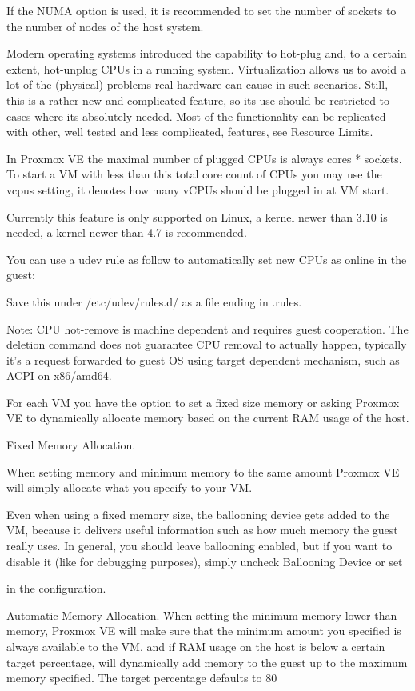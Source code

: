 If the NUMA option is used, it is recommended to set the number of sockets to the number of nodes of the host system.

Modern operating systems introduced the capability to hot-plug and, to a certain extent, hot-unplug CPUs in a running system. Virtualization allows us to avoid a lot of the (physical) problems real hardware can cause in such scenarios. Still, this is a rather new and complicated feature, so its use should be restricted to cases where its absolutely needed. Most of the functionality can be replicated with other, well tested and less complicated, features, see Resource Limits.

In Proxmox VE the maximal number of plugged CPUs is always cores * sockets. To start a VM with less than this total core count of CPUs you may use the vcpus setting, it denotes how many vCPUs should be plugged in at VM start.

Currently this feature is only supported on Linux, a kernel newer than 3.10 is needed, a kernel newer than 4.7 is recommended.

You can use a udev rule as follow to automatically set new CPUs as online in the guest:

Save this under /etc/udev/rules.d/ as a file ending in .rules.

Note: CPU hot-remove is machine dependent and requires guest cooperation. The deletion command does not guarantee CPU removal to actually happen, typically it’s a request forwarded to guest OS using target dependent mechanism, such as ACPI on x86/amd64.

For each VM you have the option to set a fixed size memory or asking Proxmox VE to dynamically allocate memory based on the current RAM usage of the host.

Fixed Memory Allocation.

When setting memory and minimum memory to the same amount Proxmox VE will simply allocate what you specify to your VM.

Even when using a fixed memory size, the ballooning device gets added to the VM, because it delivers useful information such as how much memory the guest really uses. In general, you should leave ballooning enabled, but if you want to disable it (like for debugging purposes), simply uncheck Ballooning Device or set

in the configuration.

Automatic Memory Allocation. When setting the minimum memory lower than memory, Proxmox VE will make sure that the minimum amount you specified is always available to the VM, and if RAM usage on the host is below a certain target percentage, will dynamically add memory to the guest up to the maximum memory specified. The target percentage defaults to 80%

